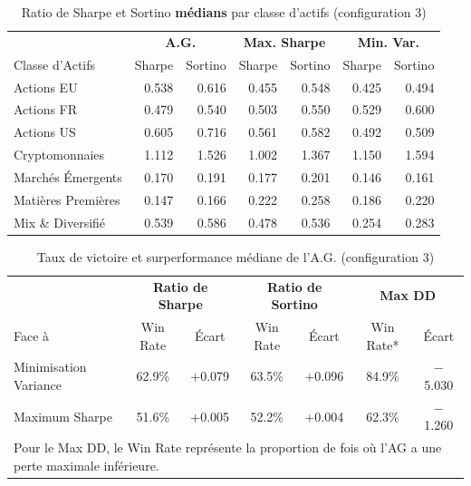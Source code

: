 \begin{table}[H]
\centering
\caption{Ratio de Sharpe et Sortino \textbf{médians} par classe d'actifs (configuration 3)\label{tab:asset_conf3}}
\footnotesize
\begin{tabular}{l|rr|rr|rr}
\toprule
& \multicolumn{2}{c|}{\textbf{A.G.}} & \multicolumn{2}{c|}{\textbf{Max. Sharpe}} & \multicolumn{2}{c}{\textbf{Min. Var.}} \\
Classe d'Actifs & Sharpe & Sortino & Sharpe & Sortino & Sharpe & Sortino \\
\midrule
Actions EU & 0.538 & 0.616 & 0.455 & 0.548 & 0.425 & 0.494 \\
Actions FR & 0.479 & 0.540 & 0.503 & 0.550 & 0.529 & 0.600 \\
Actions US & 0.605 & 0.716 & 0.561 & 0.582 & 0.492 & 0.509 \\
Cryptomonnaies & 1.112 & 1.526 & 1.002 & 1.367 & 1.150 & 1.594 \\
Marchés Émergents & 0.170 & 0.191 & 0.177 & 0.201 & 0.146 & 0.161 \\
Matières Premières & 0.147 & 0.166 & 0.222 & 0.258 & 0.186 & 0.220 \\
Mix \& Diversifié & 0.539 & 0.586 & 0.478 & 0.536 & 0.254 & 0.283 \\
\bottomrule
\end{tabular}
\end{table}

\begin{table}[H]
\centering
\caption{Taux de victoire et surperformance médiane de l'A.G. (configuration 3)\label{tab:win_conf3}}
\footnotesize
\begin{tabular}{lcc|cc|cc}
\toprule
 & \multicolumn{2}{c|}{\textbf{Ratio de Sharpe}} & \multicolumn{2}{c|}{\textbf{Ratio de Sortino}} & \multicolumn{2}{c}{\textbf{Max DD}} \\
Face à & Win Rate & Écart & Win Rate & Écart & Win Rate* & Écart \\
\midrule
Minimisation Variance & 62.9\% & +0.079 & 63.5\% & +0.096 & 84.9\% & $-$5.030 \\
Maximum Sharpe & 51.6\% & +0.005 & 52.2\% & +0.004 & 62.3\% & $-$1.260 \\
\bottomrule
\multicolumn{7}{l}{\scriptsize *Pour le Max DD, le Win Rate représente la proportion de fois où l'AG a une perte maximale inférieure.} \\
\end{tabular}
\end{table}

